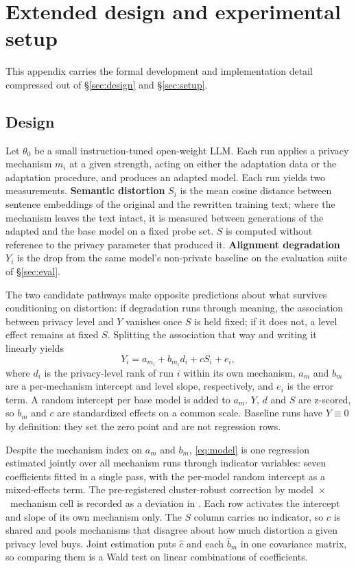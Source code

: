 \section{\label{apx:extended}Extended design and experimental setup}
This appendix carries the formal development and implementation detail compressed out of \S\ref{sec:design} and \S\ref{sec:setup}.

\subsection{\label{apx:extdesign}Design}
Let $\theta_0$ be a small instruction-tuned open-weight LLM.
Each run applies a privacy mechanism $m_i$ at a given strength,
acting on either the adaptation data or the adaptation procedure,
and produces an adapted model.
Each run yields two measurements.
\textbf{Semantic distortion} $S_i$ is the mean cosine distance between sentence embeddings of the original and the rewritten training text;
where the mechanism leaves the text intact,
it is measured between generations of the adapted and the base model on a fixed probe set.
$S$ is computed without reference to the privacy parameter that produced it.
\textbf{Alignment degradation} $Y_i$ is the drop from the same model's non-private baseline on the evaluation suite of \S\ref{sec:eval}.

The two candidate pathways make opposite predictions about what survives conditioning on distortion:
if degradation runs through meaning,
the association between privacy level and $Y$ vanishes once $S$ is held fixed;
if it does not,
a level effect remains at fixed $S$. Splitting the association that way and writing it linearly yields
\begin{equation}
  Y_i = a_{m_i} + b_{m_i} d_i + c S_i + e_i,
  \label{eq:modelext}
\end{equation}
where $d_i$ is the privacy-level rank of run $i$ within its own mechanism,
$a_m$ and $b_m$ are a per-mechanism intercept and level slope,
respectively,
and $e_i$ is the error term.
A random intercept per base model is added to $a_m$.
$Y$,
$d$ and $S$ are z-scored,
so $b_m$ and $c$ are standardized effects on a common scale.
Baseline runs have $Y \equiv 0$ by definition:
they set the zero point and are not regression rows.

Despite the mechanism index on $a_m$ and $b_m$,
\eqref{eq:model} is one regression estimated jointly over all mechanism runs through indicator variables:
seven coefficients fitted in a single pass,
with the per-model random intercept as a mixed-effects term.
The pre-registered cluster-robust correction by model~$\times$~mechanism cell is recorded as a deviation in .
Each row activates the intercept and slope of its own mechanism only.
The $S$ column carries no indicator,
so $c$ is shared and pools mechanisms that disagree about how much distortion a given privacy level buys.
Joint estimation puts $\hat c$ and each $\hat b_m$ in one covariance matrix,
so comparing them is a Wald test on linear combinations of coefficients.

